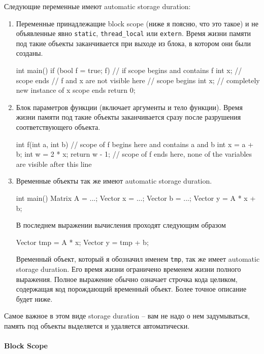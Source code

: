 \documentclass{article}
\begin{document}
Следующие переменные имеют automatic storage duration:
\begin{enumerate}
\item Переменные принадлежащие block scope (ниже я поясню, что это такое) и не объявленные явно \verb"static", \verb"thread_local" или \verb"extern".
Время жизни памяти под такие объекты заканчивается при выходе из блока, в котором они были созданы.
\begin{cppcode}[numbers = none]
int main() {
  if (bool f = true; f) { // if scope begins and contains f
    int x;
  } // scope ends
  // f and x are not visible here
  { // scope begins
    int x; // completely new instance of x
  } scope ends
  return 0;
}
\end{cppcode}

\item Блок параметров функции (включает аргументы и тело функции).
Время жизни памяти под такие объекты заканчивается сразу после разрушения соответствующего объекта.
\begin{cppcode}[numbers = none]
int f(int a, int b) { // scope of f begins here and contains a and b
  int x = a + b;
  int w = 2 * x;
  return w - 1;
} // scope of f ends here, none of the variables are visible after this line
\end{cppcode}

\item Временные объекты так же имеют automatic storage duration.
\begin{cppcode}[numbers = none]
int main() {
  Matrix A = ...;
  Vector x = ...;
  Vector b = ...;
  Vector y = A * x + b;
}
\end{cppcode}
В последнем выражении вычисления проходят следующим образом
\begin{cppcode}[numbers = none]
  Vector tmp = A * x;
  Vector y = tmp + b;
\end{cppcode}
Временный объект, который я обозначил именем \verb"tmp", так же имеет automatic storage duration.
Его время жизни ограничено временем жизни полного выражения.
Полное выражение обычно означает строчка кода целиком, содержащая код порождающий временный объект.
Более точное описание будет ниже.
\end{enumerate}
Самое важное в этом виде storage duration -- вам не надо о нем задумываться, память под объекты выделяется и удаляется автоматически.

\paragraph{Block Scope}
\end{document}
